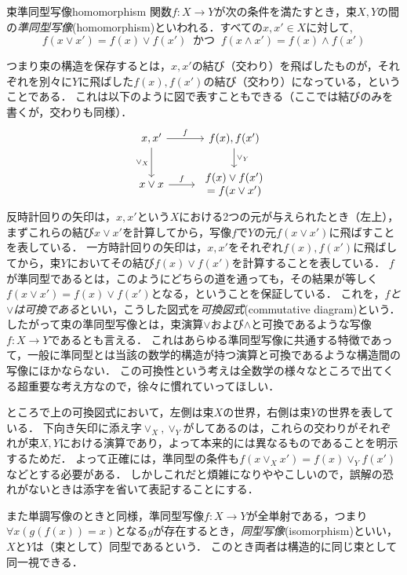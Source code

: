 \documentclass[11pt,a4paper, dvipdfmx]{jsarticle}
\begin{document}
\begin{dfn}{束準同型写像}{homomorphism}
関数$f:X \to Y$が次の条件を満たすとき，束$X, Y$の間の\emph{準同型写像}(homomorphism)といわれる．すべての$x, x' \in X$に対して, 
\[
 f(x \vee x') = f(x) \vee f(x') \ \text{ かつ } \ f(x \wedge x') = f(x) \wedge f(x')
\]
\end{dfn}
つまり束の構造を保存するとは，$x, x'$の結び（交わり）を飛ばしたものが，それぞれを別々に$Y$に飛ばした$f(x), f(x')$の結び（交わり）になっている，ということである．
これは以下のように図で表すこともできる（ここでは結びのみを書くが，交わりも同様）．
\[
\begin{tikzcd}
x, x' \arrow{r}{f} \arrow[swap]{d}{\vee_X} 
& f(x), f(x') \arrow{d}{\vee_Y} \\
x \vee x \arrow{r}{f} 
& \begin{array}{c} f(x) \vee f(x') \\ = f(x \vee x') \end{array}
\end{tikzcd}
\]
反時計回りの矢印は，$x, x'$という$X$における2つの元が与えられたとき（左上），まずこれらの結び$x \vee x'$を計算してから，写像$f$で$Y$の元$f(x \vee x')$に飛ばすことを表している．
一方時計回りの矢印は，$x, x'$をそれぞれ$f(x), f(x')$に飛ばしてから，束$Y$においてその結び$f(x) \vee f(x')$を計算することを表している．
$f$が準同型であるとは，このようにどちらの道を通っても，その結果が等しく$f(x \vee x') = f(x) \vee f(x')$となる，ということを保証している．
これを，\emph{$f$と$\vee$は可換である}といい，こうした図式を\emph{可換図式}(commutative diagram)という．
したがって束の準同型写像とは，束演算$\vee$および$\wedge$と可換であるような写像$f:X \to Y$であるとも言える．
これはあらゆる準同型写像に共通する特徴であって，一般に準同型とは当該の数学的構造が持つ演算と可換であるような構造間の写像にほかならない．
この可換性という考えは全数学の様々なところで出てくる超重要な考え方なので，徐々に慣れていってほしい．

ところで上の可換図式において，左側は束$X$の世界，右側は束$Y$の世界を表している．
下向き矢印に添え字$\vee_X, \vee_Y$がしてあるのは，これらの交わりがそれぞれが束$X, Y$における演算であり，よって本来的には異なるものであることを明示するためだ．
よって正確には，準同型の条件も$f(x \vee_X x') = f(x) \vee_Y f(x')$などとする必要がある．
しかしこれだと煩雑になりややこしいので，誤解の恐れがないときは添字を省いて表記することにする．


また単調写像のときと同様，準同型写像$f:X \to Y$が全単射である，つまり$\forall x (g(f(x))=x)$となる$g$が存在するとき，\emph{同型写像}(isomorphism)といい，$X$と$Y$は（束として）同型であるという．
このとき両者は構造的に同じ束として同一視できる．
\end{document}

